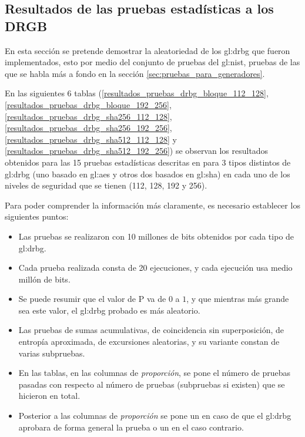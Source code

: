%
%

\subsection{Resultados de las pruebas estadísticas a los DRGB}
\label{sec:resultados_pruebas_estadisticas_drgb}

En esta sección se pretende demostrar la aleatoriedad de los \gls{gl:drbg}
que fueron implementados, esto por medio del conjunto de pruebas del
\gls{gl:nist}, pruebas de las que se habla más a fondo en la sección
\ref{sec:pruebas_para_generadores}.

En las siguientes 6 tablas
(\ref{resultados_pruebas_drbg_bloque_112_128},
\ref{resultados_pruebas_drbg_bloque_192_256},
\ref{resultados_pruebas_drbg_sha256_112_128},
\ref{resultados_pruebas_drbg_sha256_192_256},
\ref{resultados_pruebas_drbg_sha512_112_128} y
\ref{resultados_pruebas_drbg_sha512_192_256})
se observan los resultados obtenidos para las 15 pruebas estadísticas
descritas en \cite{nist_pruebas} para 3 tipos distintos de \gls{gl:drbg}
(uno basado en \gls{gl:aes} y otros dos basados en \gls{gl:sha}) en cada
uno de los niveles de seguridad que se tienen (112, 128, 192 y 256).

Para poder comprender la información más claramente, es necesario establecer
los siguientes puntos:

\begin{itemize}

  \item Las pruebas se realizaron con 10 millones de bits obtenidos por cada
    tipo de \gls{gl:drbg}.

  \item Cada prueba realizada consta de 20 ejecuciones, y cada ejecución usa
    medio millón de bits.

  \item Se puede resumir que el valor de P va de $0$ a $1$, y que mientras
    más grande sea este valor, el \gls{gl:drbg} probado es más aleatorio.

  \item Las pruebas de sumas acumulativas, de coincidencia sin superposición,
    de entropía aproximada, de excursiones aleatorias, y su variante constan
    de varias subpruebas.

  \item En las tablas, en las columnas de \textit{proporción}, se pone el
    número de pruebas pasadas con respecto al número de pruebas (subpruebas
    si existen) que se hicieron en total.

  \item Posterior a las columnas de \textit{proporción} se pone un 
    en caso de que el \gls{gl:drbg} aprobara de forma general la prueba o un
     en el caso contrario.

\end{itemize}


